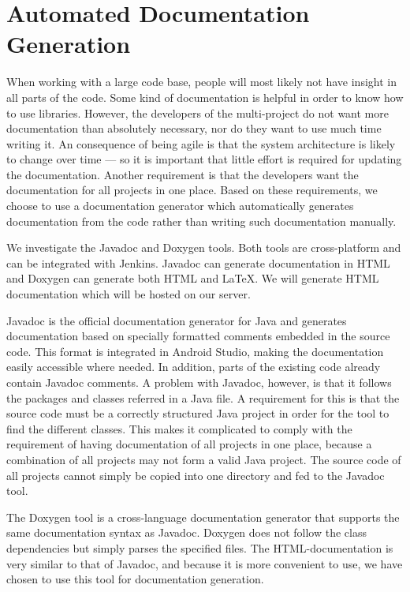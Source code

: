

\section{Automated Documentation Generation}\label{sec:automated_documentation_gen}
When working with a large code base, people will most likely not have insight in all parts of the code. Some kind of documentation is helpful in order to know how to use libraries. However, the developers of the multi-project do not want more documentation than absolutely necessary, nor do they want to use much time writing it. An consequence of being agile is that the system architecture is likely to change over time --- so it is important that little effort is required for updating the documentation. Another requirement is that the developers want the documentation for all projects in one place. Based on these requirements, we choose to use a documentation generator which automatically generates documentation from the code rather than writing such documentation manually.

We investigate the Javadoc \parencite{javadoc} and Doxygen \parencite{doxygen} tools. Both tools are cross-platform and can be integrated with Jenkins. Javadoc can generate documentation in HTML and Doxygen can generate both HTML and \LaTeX. We will generate HTML documentation which will be hosted on our server.

Javadoc is the official documentation generator for Java and generates documentation based on specially formatted comments embedded in the source code. This format is integrated in Android Studio, making the documentation easily accessible where needed. In addition, parts of the existing code already contain Javadoc comments. A problem with Javadoc, however, is that it follows the packages and classes referred in a Java file. A requirement for this is that the source code must be a correctly structured Java project in order for the tool to find the different classes. This makes it complicated to comply with the requirement of having documentation of all projects in one place, because a combination of all projects may not form a valid Java project. The source code of all projects cannot simply be copied into one directory and fed to the Javadoc tool.

The Doxygen tool is a cross-language documentation generator that supports the same documentation syntax as Javadoc. Doxygen does not follow the class dependencies but simply parses the specified files. The HTML-documentation is very similar to that of Javadoc, and because it is more convenient to use, we have chosen to use this tool for documentation generation.

